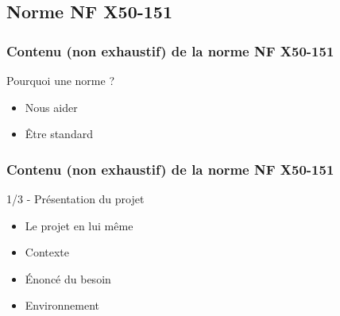 \subsection{Norme NF X50-151}

\begin{frame}
\tableofcontents[subsectionstyle=show/shaded/hide, subsubsectionstyle=hide, sectionstyle=show/hide]
\end{frame}

\begin{frame}
\frametitle{Contenu (non exhaustif) de la norme NF X50-151}

\begin{block}{Pourquoi une norme ?}
\begin{itemize}
    \item Nous aider %
    \item Être \og{}standard\fg{} %
\end{itemize}
\end{block}
\end{frame}

\begin{frame}
\frametitle{Contenu (non exhaustif) de la norme NF X50-151}
\begin{exampleblock}{1/3 - Présentation du projet}
\begin{itemize}
    \item Le projet en lui même %
    \item Contexte %
    \item Énoncé du besoin %
    \item Environnement %
\end{itemize}
\end{exampleblock}
\end{frame}

